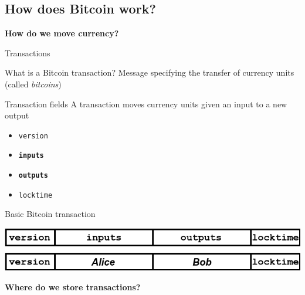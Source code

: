 \documentclass{beamer}
\begin{document}
\subsection{How does Bitcoin work?}
\begin{frame}
 \begin{center}
  \textbf{How do we move currency?}
 \end{center}
\end{frame}
\begin{frame}{Transactions}
 \begin{block}{What is a Bitcoin transaction?}
  Message specifying the transfer of currency units (called \textit{bitcoins})
 \end{block}
 \pause
 \begin{block}{Transaction fields}
  A transaction moves currency units given an input to a new output
  \begin{itemize}[<+->]
   \item \texttt{version}
   \item \textbf{\texttt{inputs}}
   \item \textbf{\texttt{outputs}}
   \item \texttt{locktime}
  \end{itemize}
 \end{block}
 \pause
 \begin{exampleblock}{Basic Bitcoin transaction}
  \begin{center}
   \includegraphics[width=\textwidth, height=0.8\textheight, keepaspectratio]{img/basic_tx.png}
  \end{center}
 \end{exampleblock}
\end{frame}
\begin{frame}
 \begin{center}
  \textbf{Where do we store transactions?}
 \end{center}
\end{frame}
\end{document}
